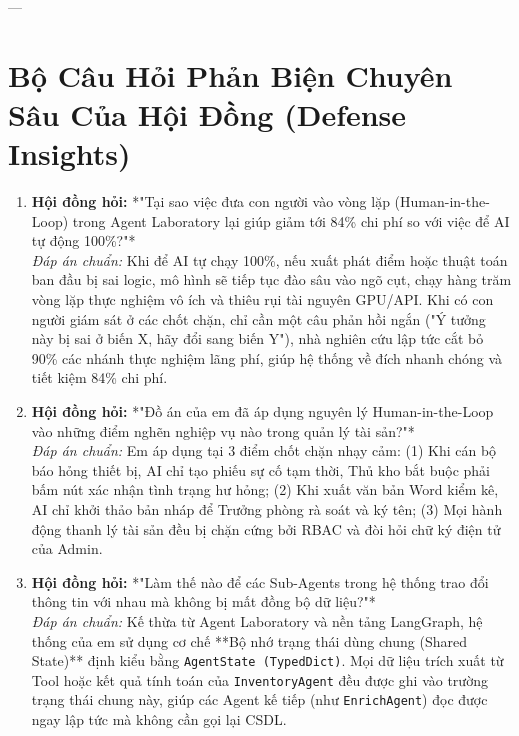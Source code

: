 \documentclass[11pt,a4paper]{article}
\begin{document}
---

\section{Bộ Câu Hỏi Phản Biện Chuyên Sâu Của Hội Đồng (Defense Insights)}

\begin{deepdivebox}
\begin{enumerate}[leftmargin=1.5em]
    \item \textbf{Hội đồng hỏi:} *"Tại sao việc đưa con người vào vòng lặp (Human-in-the-Loop) trong Agent Laboratory lại giúp giảm tới 84\% chi phí so với việc để AI tự động 100\%?"*\\
    \textit{Đáp án chuẩn:} Khi để AI tự chạy 100\%, nếu xuất phát điểm hoặc thuật toán ban đầu bị sai logic, mô hình sẽ tiếp tục đào sâu vào ngõ cụt, chạy hàng trăm vòng lặp thực nghiệm vô ích và thiêu rụi tài nguyên GPU/API. Khi có con người giám sát ở các chốt chặn, chỉ cần một câu phản hồi ngắn ("Ý tưởng này bị sai ở biến X, hãy đổi sang biến Y"), nhà nghiên cứu lập tức cắt bỏ 90\% các nhánh thực nghiệm lãng phí, giúp hệ thống về đích nhanh chóng và tiết kiệm 84\% chi phí.
    
    \item \textbf{Hội đồng hỏi:} *"Đồ án của em đã áp dụng nguyên lý Human-in-the-Loop vào những điểm nghẽn nghiệp vụ nào trong quản lý tài sản?"*\\
    \textit{Đáp án chuẩn:} Em áp dụng tại 3 điểm chốt chặn nhạy cảm: (1) Khi cán bộ báo hỏng thiết bị, AI chỉ tạo phiếu sự cố tạm thời, Thủ kho bắt buộc phải bấm nút xác nhận tình trạng hư hỏng; (2) Khi xuất văn bản Word kiểm kê, AI chỉ khởi thảo bản nháp để Trưởng phòng rà soát và ký tên; (3) Mọi hành động thanh lý tài sản đều bị chặn cứng bởi RBAC và đòi hỏi chữ ký điện tử của Admin.

    \item \textbf{Hội đồng hỏi:} *"Làm thế nào để các Sub-Agents trong hệ thống trao đổi thông tin với nhau mà không bị mất đồng bộ dữ liệu?"*\\
    \textit{Đáp án chuẩn:} Kế thừa từ Agent Laboratory và nền tảng LangGraph, hệ thống của em sử dụng cơ chế **Bộ nhớ trạng thái dùng chung (Shared State)** định kiểu bằng \texttt{AgentState (TypedDict)}. Mọi dữ liệu trích xuất từ Tool hoặc kết quả tính toán của \texttt{InventoryAgent} đều được ghi vào trường trạng thái chung này, giúp các Agent kế tiếp (như \texttt{EnrichAgent}) đọc được ngay lập tức mà không cần gọi lại CSDL.
\end{enumerate}
\end{deepdivebox}
\end{document}
